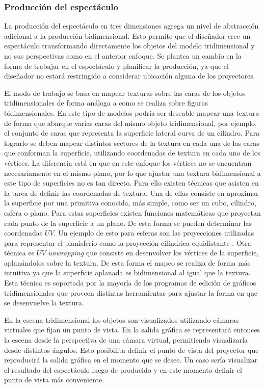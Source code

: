 \subsubsection{Producción del espectáculo}
La producción del espectáculo en tres dimensiones agrega un nivel de abstracción adicional a la producción bidimensional. Esto permite que el diseñador cree un espectáculo transformando directamente los objetos del modelo tridimensional y no sus perspectivas como en el anterior enfoque.
Se plantea un cambio en la forma de trabajar en el espectáculo y planificar la producción, ya que el diseñador no estará restringido a considerar ubicación alguna de los proyectores.

El modo de trabajo se basa en mapear texturas sobre las caras de los objetos tridimensionales de forma análoga a como se realiza sobre figuras bidimensionales. En este tipo de modelos podría ser deseable mapear una textura de forma que abarque varias caras del mismo objeto tridimensional, por ejemplo, el conjunto de caras que representa la superficie lateral curva de un cilindro. Para lograrlo se deben mapear distintos sectores de la textura en cada una de las caras que conforman la superficie, utilizando coordenadas de textura en cada uno de los vértices. La diferencia está en que en este enfoque los vértices no se encuentran necesariamente en el mismo plano, por lo que ajustar una textura bidimensional a este tipo de superficies no es tan directo. Para ello existen técnicas que asisten en la tarea de definir las coordenadas de textura. Una de ellas consiste en aproximar la superficie por una primitiva conocida, más simple, como ser un cubo, cilindro, esfera o plano. Para estas superficies existen funciones matemáticas que proyectan cada punto de la superficie a un plano. De esta forma se pueden determinar las coordenadas $UV$. Un ejemplo de esto para esferas son las proyecciones utilizadas para representar el planisferio como la proyección cilíndrica equidistante \cite{flatteningTheEarth}. Otra técnica es $UV$ \emph{unwrapping} que consiste en desenvolver los vértices de la superficie, aplanándolos sobre la textura. De esta forma el mapeo se realiza de forma más intuitiva ya que la superficie aplanada es bidimensional al igual que la textura. Esta técnica es soportada por la mayoría de los programas de edición de gráficos tridimensionales que proveen distintas herramientas para ajustar la forma en que se desenvuelve la textura.

En la escena tridimensional los objetos son visualizados utilizando cámaras virtuales que fijan un punto de vista. En la salida gráfica se representará entonces la escena desde la perspectiva de una cámara virtual, permitiendo visualizarla desde distintos ángulos. Esto posibilita definir el punto de vista del proyector que reproducirá la salida gráfica en el momento que se desee. Un caso sería visualizar el resultado del espectáculo luego de producido y en este momento definir el punto de vista más conveniente.

